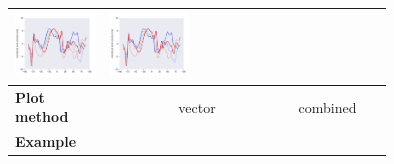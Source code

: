 \begin{refsection}
\begin{subappendices}
\begin{tabular}[c]{l|p{0.25\linewidth}|p{0.25\linewidth}|p{0.25\linewidth}|}
				\includegraphics[width=\linewidth, page=5]{psyplot-figures/psy-simple-demo.pdf} &
				\includegraphics[width=\linewidth, page=6]{psyplot-figures/psy-simple-demo.pdf} \\
			\midrule
			\midrule
			\textbf{Plot method} & \multicolumn{2}{c|}{vector} & combined \\
			\hline
			\textbf{Example} &

\end{tabular}
\end{subappendices}
\end{refsection}
